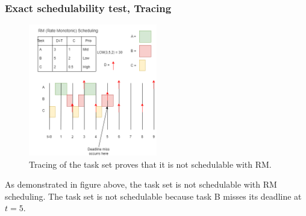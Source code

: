             \subsubsection{\textbf{Exact schedulability test, Tracing}}
            \begin{figure}[H]
                \centering
                \includegraphics[width=0.5\textwidth]{images/Ass1Q2.drawio.png}
                \caption{Tracing of the task set proves that it is not schedulable with RM.}
                \label{fig:tracing}
            \end{figure}

        As demonstrated in figure above, the task set is not schedulable with RM scheduling. The task set is not schedulable because task B misses its deadline at $t = 5$.

